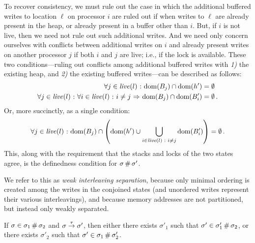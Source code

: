 \documentclass[11pt]{report}
\begin{document}
To recover consistency, we must rule out the case in which the additional buffered writes to location $\ell$ on processor $i$ are ruled out if when writes to $\ell$ are already present in the heap, or already present in a buffer other than $i$. But, if $i$ is not live, then we need not rule out such additional writes. And we need only concern ourselves with conflicts between additional writes on $i$ and already present writes on another processor $j$ if both $i$ and $j$ are live; i.e., if the lock is available. These two conditions---ruling out conflicts among additional buffered writes with \emph{1)} the existing heap, and \emph{2)} the existing buffered writes---can be described as follows: \begin{align*}
	\forall j \in  \mathit{live}(l) \operatorname{\,:\,} \operatorname{\mathrm{dom}}(B_j) \cap \operatorname{\mathrm{dom}}(h') & = \operatorname{\emptyset} \\
	\forall j \in  \mathit{live}(l) \operatorname{\,:\,} \forall i \in \mathit{live}(l) \operatorname{\,:\,} i \neq j \operatorname{\,\Rightarrow\,} \operatorname{\mathrm{dom}}(B_j) \cap \operatorname{\mathrm{dom}}(B'_i) & = \operatorname{\emptyset}. \\
\end{align*} Or, more succinctly, as a single condition: \[ \forall j \in \mathit{live}(l) \operatorname{\,:\,} \operatorname{\mathrm{dom}}(B_j) \cap \left( \operatorname{\mathrm{dom}}(h') \cup \bigcup_{i \in \mathit{live}(l) \operatorname{\,:\,} i \neq j} \operatorname{\mathrm{dom}}(B'_i)\right) = \operatorname{\emptyset}. \] 
This, along with the requirement that the stacks and locks of the two states agree, is the definedness condition for $\sigma \operatorname{\#} \sigma'$.

We refer to this as \emph{weak interleaving separation}, because only minimal ordering is created among the writes in the conjoined states (and unordered writes represent their various interleavings), and because memory addresses are not partitioned, but instead only weakly separated. 

\begin{lemma}
	\label{lem:separation-tau}
	If $\sigma \in \sigma_1 \operatorname{\#} \sigma_2$ and $\sigma \stackrel{\tau}{\rightarrow} \sigma'$, then either there exists $\sigma'_1$ such that $\sigma' \in \sigma'_1 \operatorname{\#} \sigma_2$, or there exists $\sigma'_2$ such that $\sigma' \in \sigma_1 \operatorname{\#} \sigma'_2$.
\end{lemma}
\end{document}
